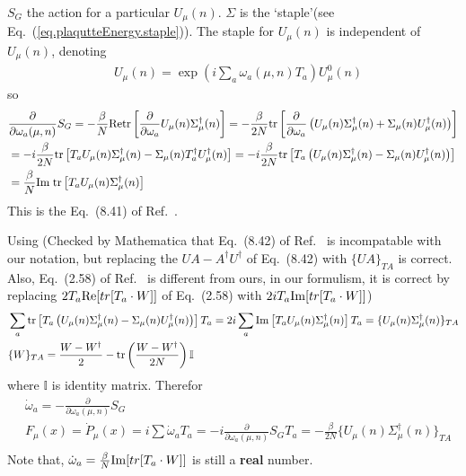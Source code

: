 $S_G$ the action for a particular $U_{\mu}(n)$. $\Sigma$ is the `staple'(see Eq.~(\ref{eq.plaqutteEnergy.staple})). The staple for $U_{\mu}(n)$ is independent of $U_{\mu}(n)$, denoting
\begin{equation}
\begin{split}
&U_{\mu}(n)=\exp \left(i \sum _a\omega _a(\mu,n) T_a\right)U_{\mu}^0(n)
\end{split}
\end{equation}
so
\begin{equation}
\begin{split}
&\frac{\partial}{\partial \omega _a (\mu,n)}S_G=-\frac{\beta}{N}{\rm Re}{\rm tr}\left[\frac{\partial}{\partial \omega _a}U_{\mu}(n)\Sigma ^{\dagger}_{\mu}(n)\right]=-\frac{\beta}{2N}{\rm tr}\left[\frac{\partial}{\partial \omega _a}\left(U_{\mu}(n)\Sigma ^{\dagger}_{\mu}(n)+\Sigma _{\mu}(n)U^{\dagger}_{\mu}(n)\right)\right]\\
&=-i\frac{\beta}{2N}{\rm tr}\left[T_aU_{\mu}(n)\Sigma ^{\dagger}_{\mu}(n)-\Sigma _{\mu}(n)T^{\dagger}_aU^{\dagger}_{\mu}(n)\right]=-i\frac{\beta}{2N}{\rm tr}\left[T_a\left(U_{\mu}(n)\Sigma ^{\dagger}_{\mu}(n)-\Sigma _{\mu}(n)U^{\dagger}_{\mu}(n)\right)\right]\\
&=\frac{\beta}{N} {\rm Im\;tr}\left[T_aU_{\mu}(n)\Sigma ^{\dagger}_{\mu}(n)\right]\\
\end{split}
\end{equation}
This is the Eq.~(8.41) of Ref.~\cite{latticeqcdbook2010}.

Using (Checked by Mathematica that Eq.~(8.42) of Ref.~\cite{latticeqcdbook2010} is incompatable with our notation, but replacing the $UA-A^{\dagger}U^{\dagger}$ of Eq.~(8.42) with $\{UA\}_{TA}$ is correct. Also, Eq.~(2.58) of Ref.~\cite{latticeqcdbook2017} is different from ours, in our formulism, it is correct by replacing $2T_a{\rm Re}[tr[T_a\cdot W]]$ of Eq.~(2.58) with $2iT_a{\rm Im}[tr[T_a\cdot W]]$)
\begin{equation}
\begin{split}
&\sum _a {\rm tr}\left[T_a\left(U_{\mu}(n)\Sigma ^{\dagger}_{\mu}(n)-\Sigma _{\mu}(n)U^{\dagger}_{\mu}(n)\right)\right]T_a=2i\sum _a{\rm Im}\left[T_aU_{\mu}(n)\Sigma ^{\dagger}_{\mu}(n)\right]T_a=\{U_{\mu}(n)\Sigma ^{\dagger}_{\mu}(n)\}_{TA}\\
&\{W\}_{TA}=\frac{W-W^{\dagger}}{2}-{\rm tr}\left(\frac{W-W^{\dagger}}{2N}\right)\mathbb{I}\\
\end{split}
\end{equation}
where $\mathbb{I}$ is identity matrix. Therefor
\begin{equation}
\begin{split}
&\dot{\omega} _a=-\frac{\partial}{\partial \omega _a (\mu,n)}S_G\\
&F_{\mu}(x)=\dot{P}_{\mu}(x)=i\sum \dot{\omega}_a T_a=-i\frac{\partial}{\partial \omega _a (\mu,n)}S_G T_a=-\frac{\beta}{2N}\{U_{\mu}(n)\Sigma ^{\dagger}_{\mu}(n)\}_{TA}\\
\end{split}
\label{eq.hmc.force}
\end{equation}
Note that, $\dot{\omega}_a=\frac{\beta}{N}{\rm Im}[tr[T_a\cdot W]]$ is still a \textbf{real} number.


